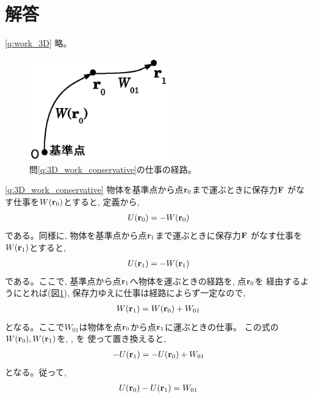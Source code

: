 \section{解答}
{}\ref{q:work_3D} 略。\mv

%
\begin{figure}[h]
    \centering
    \includegraphics[width=6.0cm]{cons_force_3D.eps}
    \caption{問\ref{q:3D_work_conservative}の仕事の経路。}\label{fig:cons_force_3D}
\end{figure}
\ref{q:3D_work_conservative}
物体を基準点から点${\bf r}_0$まで運ぶときに保存力${\bf F}$
がなす仕事を$W({\bf r}_0)$とすると, 定義から, 
\begin{eqnarray}
U({\bf r}_0)=-W({\bf r}_0)\label{q:3D_work_conservative_ans1}
\end{eqnarray}
である。同様に, 物体を基準点から点${\bf r}_1$まで運ぶときに保存力${\bf F}$
がなす仕事を$W({\bf r}_1)$とすると, 
\begin{eqnarray}
U({\bf r}_1)=-W({\bf r}_1)\label{q:3D_work_conservative_ans2}
\end{eqnarray}
である。ここで, 基準点から点${\bf r}_1$へ物体を運ぶときの経路を, 点${\bf r}_0$を
経由するようにとれば(図\ref{fig:cons_force_3D}), 保存力ゆえに仕事は経路によらず一定なので, 
\begin{eqnarray}
W({\bf r}_1)=W({\bf r}_0)+W_{01}
\end{eqnarray}
となる。ここで$W_{01}$は物体を点${\bf r}_0$から点${\bf r}_1$に運ぶときの仕事。
この式の$W({\bf r}_0), W({\bf r}_1)$を, 
, を
使って置き換えると, 
\begin{eqnarray}
-U({\bf r}_1)=-U({\bf r}_0)+W_{01}
\end{eqnarray}
となる。従って, 
\begin{eqnarray}
U({\bf r}_0)-U({\bf r}_1)=W_{01}
\end{eqnarray}


